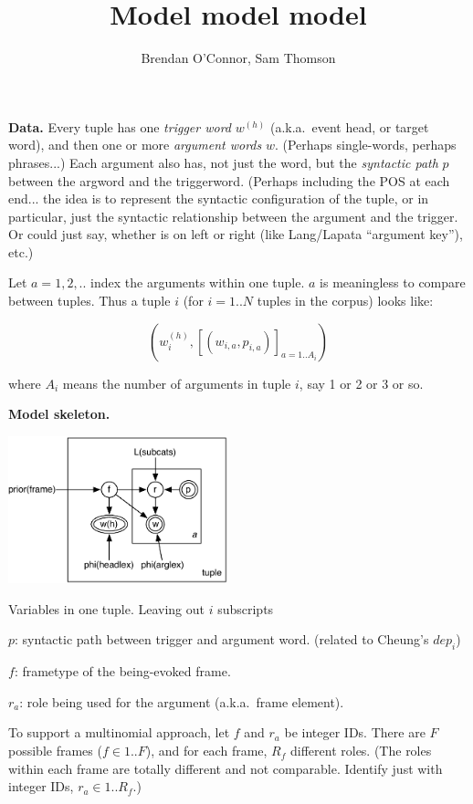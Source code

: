 \documentclass[11pt,letterpaper]{article}
\title{
  Model model model
}
\author{
Brendan O'Connor, Sam Thomson
}
\newenvironment{itemizesquish}{\begin{list}{\labelitemi}{\setlength{\itemsep}{0em}\setlength{\labelwidth}{0.5em}\setlength{\leftmargin}{\labelwidth}\addtolength{\leftmargin}{\labelsep}}}{\end{list}}
\begin{document}
\maketitle

\textbf{Data.} Every tuple has one \emph{trigger word} $w^{(h)}$ (a.k.a.~event head, or target word), and then one or more \emph{argument words} $w$.  (Perhaps single-words, perhaps phrases...)  Each argument also has, not just the word, but the \emph{syntactic path} $p$ between the argword and the triggerword.  (Perhaps including the POS at each end... the idea is to represent the syntactic configuration of the tuple, or in particular, just the syntactic relationship between the argument and the trigger.  Or could just say, whether is on left or right (like Lang/Lapata ``argument key''), etc.)

Let $a=1,2,..$ index the arguments within one tuple.  $a$ is meaningless to compare between tuples.  Thus a tuple $i$ (for $i=1..N$ tuples in the corpus) looks like:

\[ (w^{(h)}_i, [(w_{i,a}, p_{i,a})]_{a=1..A_i}) \]

where $A_i$ means the number of arguments in tuple $i$, say 1 or 2 or 3 or so.

\textbf{Model skeleton.}

\includegraphics[width=2.5in]{diagram}

Variables in one tuple.  Leaving out $i$ subscripts

\begin{itemizesquish}
  \item $p$: syntactic path between trigger and argument word.  (related to Cheung's $dep_i$)
  \item $f$: frametype of the being-evoked frame.
  \item $r_a$: role being used for the argument (a.k.a.~frame element).
\end{itemizesquish}

To support a multinomial approach, let $f$ and $r_a$ be integer IDs.
There are $F$ possible frames ($f \in 1..F$), and for each frame, $R_f$ different roles.  (The roles within each frame are totally different and not comparable.  Identify just with integer IDs, $r_a \in 1..R_f$.)
\end{document}
